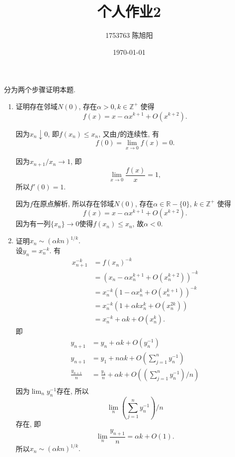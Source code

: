 \documentclass[a4paper,12pt]{ctexart}
\title{个人作业2}
\author{1753763 陈旭阳}
\date{\today}
\begin{document}
    \pagestyle{empty}
    \maketitle
    \newpage
    \pagestyle{fancy}
    \linenumbers

    \begin{solution}
        分为两个步骤证明本题.
        \begin{enumerate}[Step 1.]
        \item 证明存在邻域$N(0)$, 存在$\alpha >0, k\in \mathbb{Z^+}$
            使得\[f(x)=x-\alpha x^{k+1}+O(x^{k+2}).\]
            
            因为$x_n\downarrow 0$, 即$f(x_n)\le x_n$, 又由$f$的连续性, 有
            \[f(0) = \lim_{x\to 0}{f(x)=0}.\]
            
            因为$x_{n+1}/x_n \to 1$, 即
            \[\lim_{x\to 0}{\frac{f(x)}{x}}=1,\] 所以$f'(0)=1$.

            因为$f$在原点解析, 所以存在邻域$N(0)$,
            存在$\alpha \in \mathbb{R}-\{0\}$, $k\in \mathbb{Z^+}$
            使得\[f(x)=x-\alpha x^{k+1}+O(x^{k+2}).\]
            因为有一列$\{x_n\}\to 0$使得$f(x_n) \le x_n$,
            故$\alpha <0$.
        \item 证明$x_n \sim (\alpha k n)^{1/k}.$\\
            设$y_n=x_n^{-k}.$ 有
            \begin{equation}
                \begin{aligned}
                    x_{n+1}^{-k} &= f(x_n)^{-k}\\
                    &= (x_n-\alpha x_n^{k+1}+O(x_n^{k+2}))^{-k}\\
                    &= x_n^{-k}(1-\alpha x_n^k + O(x_n^{k+1}))^{-k}\\
                    &= x_n^{-k}(1+\alpha kx_n^{k}+O(x_n^{2k}))\\
                    &= x_n^{-k}+\alpha k + O(x_n^k).
                \end{aligned}
            \end{equation}
            即
            \begin{equation}
                \begin{aligned}
                    y_{n+1} &= y_n + \alpha k + O(y_n^{-1})\\
                    y_{n+1} &= y_1 + n\alpha k + O(\sum_{j=1}^{n}{y_n^{-1}})\\
                    \frac{y_{n+1}}{n} &= \frac{y_1}{n} + \alpha k
                        + O((\sum_{j=1}^{n}{y_n^{-1}})/n)\\
                \end{aligned}
            \end{equation}
            因为$\lim_{n}{y_n^{-1}}$存在, 所以
            \[\lim_{n}{(\sum_{j=1}^{n}{y_n^{-1}})/n}\]存在, 即
            \[\lim_{n}{\frac{y_{n+1}}{n}} = \alpha k + O(1).\]
            所以$x_n \sim (\alpha k n)^{1/k}.$
        \end{enumerate}
    \end{solution}
\end{document}
